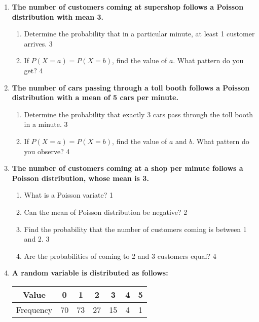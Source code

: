 \documentclass[a4paper,oneside, margin=1.4in]{book}
\begin{document}
\begin{enumerate}
   \item
	  \textbf{The number of customers coming at supershop follows a Poisson 
	  distribution with mean 3.} 
  
  \begin{enumerate}
    \item  
	Determine the probability that in a particular minute, at least 1 customer 
	arrives. \hfill 3
    \item
	If $P(X = a) = P(X= b)$, find the value of $a$. What pattern do you get?
	\hfill 4
  \end{enumerate}
  
  \item
	  \textbf{The number of cars passing through a toll booth follows a 
	  Poisson distribution with a mean of 5 cars per minute.} 
  
  \begin{enumerate}
    \item  
	Determine the probability that exactly 3 cars pass through the toll 
	booth in a minute. \hfill 3
    \item
	If $P(X = a) = P(X = b)$, find the value of $a$ and $b$. What pattern do 
	you observe? \hfill 4
  \end{enumerate}

  
  \item
	  \textbf{The number of customers coming at a shop per minute follows a 
	  Poisson distribution,  whose mean is 3.} 
  
  \begin{enumerate}
    \item
	What is a Poisson variate? \hfill 1
    \item
	Can the mean of Poisson distribution be negative? \hfill 2
    \item  
	Find the probability that the number of customers coming is between 1 and 2. \hfill 3
    \item
	Are the probabilities of coming to 2 and 3 customers equal?  \hfill 4
  \end{enumerate}

 \item
	  \textbf{A random variable is distributed as follows:} 
	  
	  \begin{table}[h]
	  \centering
\begin{tabular}{c|c|c|c|c|c|c}
Value & 0 & 1 & 2 & 3 & 4 & 5 \\ \hline
Frequency & 70 & 73 & 27 & 15 & 4 & 1
\end{tabular}
\end{table}
  

\end{enumerate}
\end{document}
